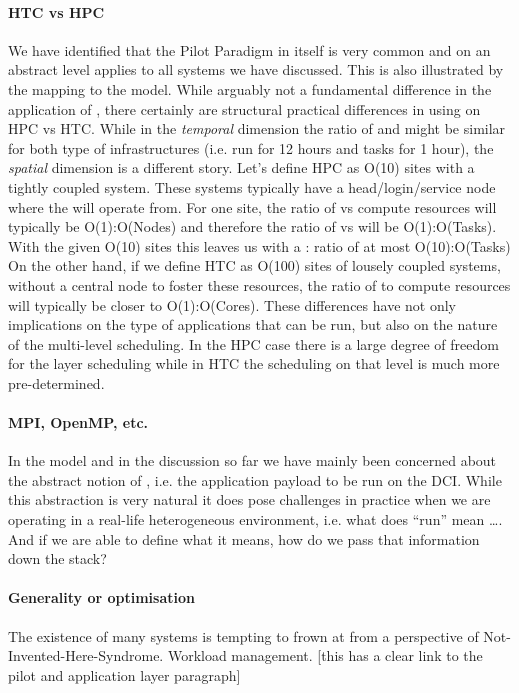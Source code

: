 \documentclass{sig-alternate}
\begin{document}
\paragraph*{HTC vs HPC} We have identified that the Pilot Paradigm in itself is
very common and on an abstract level applies to all \pilot systems we have
discussed. This is also illustrated by the mapping to the \pstar model.
While arguably not a fundamental difference in the application of \pilots,
there certainly are structural practical differences in using \pilots on HPC vs
HTC.
While in the \textit{temporal} dimension the ratio of  and \pilots might
be similar for both type of infrastructures (i.e. \pilots run for 12 hours and
tasks for 1 hour), the \textit{spatial} dimension is a different story.
Let's define HPC as O(10) sites with a tightly coupled system.
These systems typically have a head/login/service node where the \pilot will
operate from.
For one site, the ratio of \pilots vs compute resources will typically be
O(1):O(Nodes) and therefore the ratio of \pilots vs  will be
O(1):O(Tasks).
With the given O(10) sites this leaves us with a \pilot: ratio of at most
O(10):O(Tasks)
On the other hand, if we define HTC as O(100) sites of lousely coupled systems,
without a central node to foster these resources, the ratio of \pilots to
compute resources will typically be closer to O(1):O(Cores).
These differences have not only implications on the type of applications that
can be run, but also on the nature of the multi-level scheduling. In the HPC
case there is a large degree of freedom for the \pilot layer scheduling while
in HTC the scheduling on that level is much more pre-determined.

\paragraph*{MPI, OpenMP, etc.} In the \pstar model and in the discussion so far
we have mainly been concerned about the abstract notion of , i.e.
the application payload to be run on the DCI.
While this abstraction is very natural it does pose challenges in practice when
we are operating in a real-life heterogeneous environment, i.e. what does
``run'' mean \ldots. And if we are able to define what it means, how do we pass
that information down the stack?

\paragraph*{Generality or optimisation} The existence of many \pilot systems
is tempting to frown at from a perspective of Not-Invented-Here-Syndrome.
Workload management. [this has a clear link to the pilot and application layer
paragraph]
\end{document}
